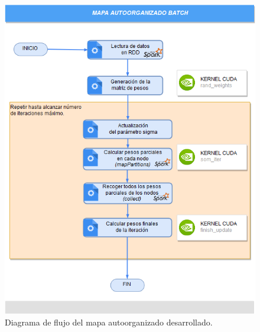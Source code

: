 \begin{figure}[ht]
\centering
\includegraphics[scale=0.5]{imagenes/flujosparksom.png}
\caption{Diagrama de flujo del mapa autoorganizado desarrollado.}
\label{image:flujosparksom}
\end{figure}

